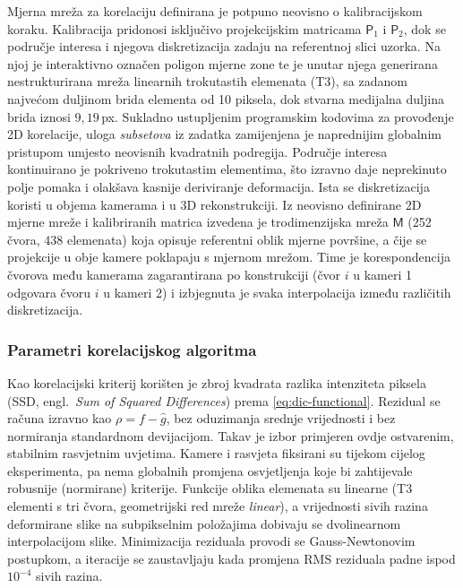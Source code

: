 Mjerna mreža za korelaciju definirana je potpuno neovisno o kalibracijskom
koraku. Kalibracija pridonosi isključivo projekcijskim matricama $\mathsf{P}_1$ i
$\mathsf{P}_2$, dok se područje interesa i njegova diskretizacija zadaju na
referentnoj slici uzorka. Na njoj je interaktivno označen poligon
mjerne zone te je unutar njega generirana nestrukturirana mreža linearnih
trokutastih elemenata (T3), sa zadanom najvećom duljinom brida elementa od
10 piksela, dok stvarna medijalna duljina brida iznosi $9{,}19$\,px.
Sukladno ustupljenim programskim kodovima za provođenje 2D korelacije,
uloga \textit{subsetova} iz zadatka zamijenjena je naprednijim globalnim pristupom
umjesto neovisnih kvadratnih podregija. Područje interesa kontinuirano je
pokriveno trokutastim elementima, što izravno daje neprekinuto
polje pomaka i olakšava kasnije deriviranje deformacija. Ista se
diskretizacija koristi u objema kamerama i u 3D rekonstrukciji. Iz neovisno definirane 2D mjerne mreže i kalibriranih matrica izvedena
je trodimenzijska mreža $\mathsf{M}$ (252 čvora, 438 elemenata) koja opisuje
referentni oblik mjerne površine, a čije se projekcije u obje kamere poklapaju s
mjernom mrežom. Time je korespondencija čvorova među kamerama zagarantirana po
konstrukciji (čvor $i$ u kameri 1 odgovara čvoru $i$ u kameri 2) i izbjegnuta je
svaka interpolacija između različitih diskretizacija.

\subsubsection{Parametri korelacijskog algoritma}
\label{sssec:parametri}

Kao korelacijski kriterij korišten je zbroj kvadrata razlika intenziteta piksela (SSD,
engl.\ \textit{Sum of Squared Differences}) prema \eqref{eq:dic-functional}.
Rezidual se računa izravno kao $\rho = f - \hat{g}$, bez oduzimanja srednje
vrijednosti i bez normiranja standardnom devijacijom. Takav je izbor primjeren ovdje ostvarenim,
stabilnim rasvjetnim uvjetima. Kamere i rasvjeta fiksirani su tijekom cijelog
eksperimenta, pa nema globalnih promjena osvjetljenja koje bi zahtijevale robusnije
(normirane) kriterije. Funkcije oblika elemenata su linearne (T3 elementi s tri
čvora, geometrijski red mreže \textit{linear}), a vrijednosti sivih razina deformirane
slike na subpikselnim položajima dobivaju se dvolinearnom
interpolacijom slike. Minimizacija reziduala provodi se Gauss-Newtonovim
postupkom, a iteracije se zaustavljaju kada promjena RMS reziduala padne ispod
$10^{-4}$ sivih razina.

